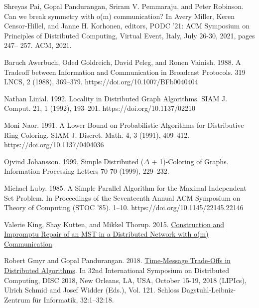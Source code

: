 \documentclass[11pt]{article}
\begin{document}
\begin{thebibliography}{9}
Shreyas Pai, Gopal Pandurangan, Sriram V. Pemmaraju, and Peter Robinson. Can we break symmetry with
o(m) communication? In Avery Miller, Keren Censor-Hillel, and Janne H. Korhonen, editors, PODC ’21:
ACM Symposium on Principles of Distributed Computing, Virtual Event, Italy, July 26-30, 2021, pages 247–
257. ACM, 2021.

Baruch Awerbuch, Oded Goldreich, David Peleg, and Ronen Vainish. 1988. A Tradeoff between Information and Communication in Broadcast
Protocols. 319 LNCS, 2 (1988), 369–379. https://doi.org/10.1007/BFb0040404

Nathan Linial. 1992. Locality in Distributed Graph Algorithms. SIAM J. Comput. 21, 1 (1992), 193–201. https://doi.org/10.1137/02210

Moni Naor. 1991. A Lower Bound on Probabilistic Algorithms for Distributive Ring Coloring. SIAM J. Discret. Math. 4, 3 (1991), 409–412. https://doi.org/10.1137/0404036

Ojvind Johansson. 1999. Simple Distributed ($\Delta$ + 1)-Coloring of Graphs. Information Processing Letters 70 70 (1999), 229–232.

 Michael Luby. 1985. A Simple Parallel Algorithm for the Maximal Independent Set Problem. In Proceedings of the Seventeenth Annual ACM Symposium on Theory of Computing (STOC ’85). 1–10. https://doi.org/10.1145/22145.22146

 Valerie King, Shay Kutten, and Mikkel Thorup. 2015. \href{https://doi.org/10.1145/2767386.2767405}{Construction and Impromptu Repair of an MST in a Distributed Network with o(m) Communication}

Robert Gmyr and Gopal Pandurangan. 2018. \href{https://doi.org/10.4230/LIPIcs.DISC.2018.32}{Time-Message Trade-Offs in Distributed Algorithms}. In 32nd International Symposium on Distributed Computing, DISC 2018, New Orleans, LA, USA, October 15-19, 2018 (LIPIcs), Ulrich Schmid and Josef Widder (Eds.), Vol. 121. Schloss Dagstuhl-Leibniz-Zentrum für Informatik, 32:1–32:18. 
\end{thebibliography}
    
\end{document}
